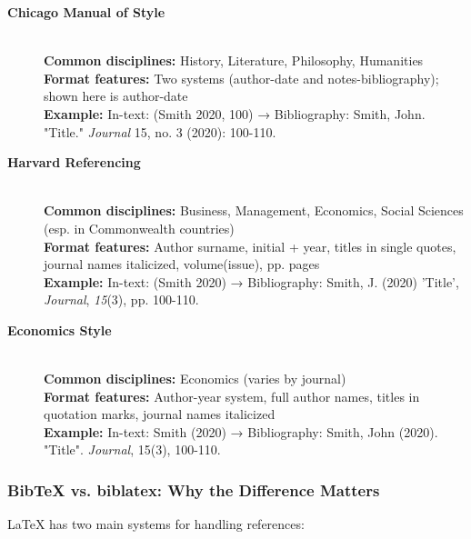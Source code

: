 \documentclass[11pt,a4paper]{ltxdoc}
\begin{document}
\begin{description}
  \item[\textbf{Chicago Manual of Style}] \hfill \\
  \textbf{Common disciplines:} History, Literature, Philosophy, Humanities \\
  \textbf{Format features:} Two systems (author-date and notes-bibliography); shown here is author-date \\
  \textbf{Example:} In-text: (Smith 2020, 100) → Bibliography: Smith, John. "Title." \emph{Journal} 15, no. 3 (2020): 100-110.
  
  \item[\textbf{Harvard Referencing}] \hfill \\
  \textbf{Common disciplines:} Business, Management, Economics, Social Sciences (esp. in Commonwealth countries) \\
  \textbf{Format features:} Author surname, initial + year, titles in single quotes, journal names italicized, volume(issue), pp. pages \\
  \textbf{Example:} In-text: (Smith 2020) → Bibliography: Smith, J. (2020) 'Title', \emph{Journal}, \emph{15}(3), pp. 100-110.
  
  \item[\textbf{Economics Style}] \hfill \\
  \textbf{Common disciplines:} Economics (varies by journal) \\
  \textbf{Format features:} Author-year system, full author names, titles in quotation marks, journal names italicized \\
  \textbf{Example:} In-text: Smith (2020) → Bibliography: Smith, John (2020). "Title". \emph{Journal}, 15(3), 100-110.
\end{description}

\subsubsection{BibTeX vs. biblatex: Why the Difference Matters}

LaTeX has two main systems for handling references:
\end{document}
